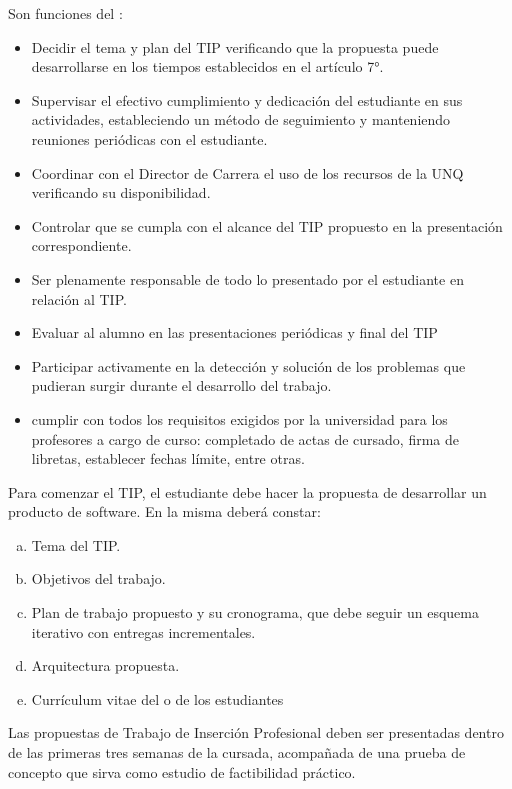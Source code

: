 \articulo Son funciones del \profesorTIP{}:
\begin{itemize}
 \item Decidir el tema y plan del TIP verificando que la
 propuesta puede desarrollarse en los tiempos establecidos en el
 artículo 7°.
 \item Supervisar el efectivo cumplimiento y dedicación del estudiante en
 sus actividades, estableciendo un método de seguimiento y
 manteniendo reuniones periódicas con el estudiante.
 \item Coordinar con el Director de Carrera el uso de los recursos de la
 UNQ verificando su disponibilidad.
 \item Controlar que se cumpla con el alcance del TIP propuesto en la
 presentación correspondiente.
 \item Ser plenamente responsable de todo lo presentado por el
 estudiante en relación al TIP.
 \item Evaluar al alumno en las presentaciones periódicas y final del TIP
 \item Participar activamente en la detección y solución de los problemas
 que pudieran surgir durante el desarrollo del trabajo.
 \item cumplir con todos los requisitos exigidos por la universidad para los profesores a cargo de curso:
 completado de actas de cursado, firma de libretas, establecer fechas límite, entre otras.
\end{itemize}



\articulo Para comenzar el TIP, el estudiante debe hacer la propuesta de desarrollar un producto de
software. En la misma deberá constar:

\begin{enumerate}[a.]
\item Tema del TIP.
\item Objetivos del trabajo.
\item Plan de trabajo propuesto y su cronograma, que debe seguir un esquema iterativo con entregas
incrementales.
\item Arquitectura propuesta.
\item Currículum vitae del o de los estudiantes
\end{enumerate}

\articulo Las propuestas de Trabajo de Inserción Profesional deben ser presentadas
dentro de las primeras tres semanas de la cursada, acompañada de una prueba de concepto
que sirva como estudio de factibilidad práctico.

